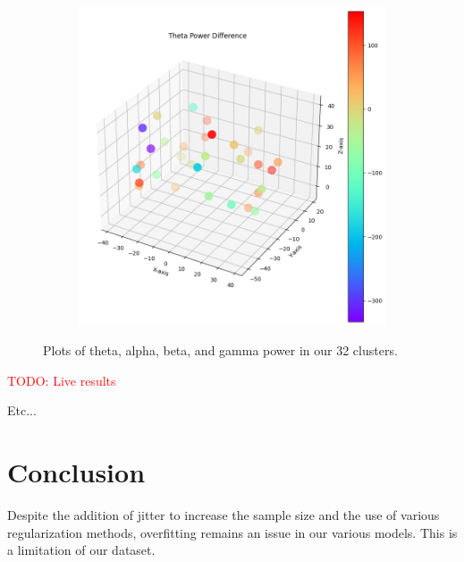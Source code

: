 \documentclass[format=sigconf, nonacm=true, review=true, screen=true]{acmart}
\newcommand{\TODO}[1]{\textcolor{red}{TODO: #1}}
\begin{document}
\begin{figure}[H]
\begin{subfigure}
     \end{subfigure}
     \begin{subfigure}
         \centering
         \includegraphics[width=0.48\columnwidth]{figures/cluster-theta.png}
     \end{subfigure}
    \caption{Plots of theta, alpha, beta, and gamma power in our 32 clusters.}
    \label{fig:cluster_visualization}
\end{figure}

\TODO{Live results}

Etc...

\section{Conclusion}

Despite the addition of jitter to increase the sample size and the use of various regularization methods, overfitting remains an issue in our various models. This is a limitation of our dataset.


\end{document}
